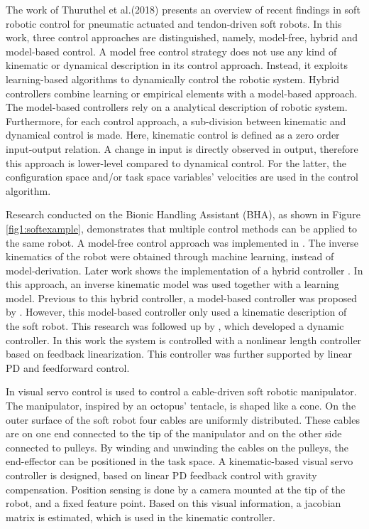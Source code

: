 The work of Thuruthel et al.(2018) \cite{george2018control} presents an overview of recent findings in soft robotic control for pneumatic actuated and tendon-driven soft robots. In this work, three control approaches are distinguished, namely, model-free, hybrid and model-based control. A model free control strategy does not use any kind of kinematic or dynamical description in its control approach. Instead, it exploits learning-based algorithms to dynamically control the robotic system. Hybrid controllers combine learning or empirical elements with a model-based approach. The model-based controllers rely on a analytical description of robotic system. Furthermore, for each control approach, a sub-division between kinematic and dynamical control is made. Here, kinematic control is defined as a zero order input-output relation. A change in input is directly observed in output, therefore this approach is lower-level compared to dynamical control. For the latter, the configuration space and/or task space variables' velocities are used in the control algorithm. 


Research conducted on the Bionic Handling Assistant (BHA), as shown in Figure \ref{fig1:softexample}, demonstrates that multiple control methods can be applied to the same robot. A model-free control approach was implemented in \cite{rolf2013efficient}. The inverse kinematics of the robot were obtained through machine learning, instead of model-derivation. Later work shows the implementation of a hybrid controller \cite{reinhart2017hybrid}. In this approach, an inverse kinematic model was used together with a learning model. Previous to this hybrid controller, a model-based controller was proposed by \cite{mahl2014bhakin}. However, this model-based controller only used a kinematic description of the soft robot. This research was followed up by \cite{falkenhahn2016dynamic}, which developed a dynamic controller. In this work the system is controlled with a nonlinear length controller based on feedback linearization. This controller was further supported by linear PD and feedforward control. 

In \cite{wang2013visual} visual servo control is used to control a cable-driven soft robotic manipulator. The manipulator, inspired by an octopus' tentacle, is shaped like a cone. On the outer surface of the soft robot four cables are uniformly distributed. These cables are on one end connected to the tip of the manipulator and on the other side connected to pulleys. By winding and unwinding the cables on the pulleys, the end-effector can be positioned in the task space. A kinematic-based visual servo controller is designed, based on linear PD feedback control with gravity compensation. Position sensing is done by a camera mounted at the tip of the robot, and a fixed feature point. Based on this visual information, a jacobian matrix is estimated, which is used in the kinematic controller.

